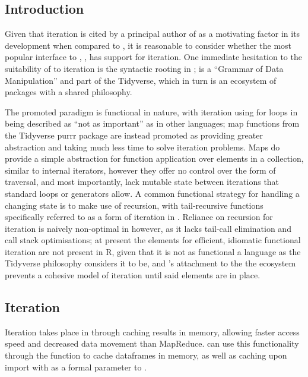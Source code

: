 \subsection{Introduction}\label{subsec:sparklyr-introduction}

Given that iteration is cited by a principal author of  as a motivating factor in its development when compared to , it is reasonable to consider whether the most popular \R{} interface to , , has support for iteration\cites{zaharia2010spark,luraschi20}.
One immediate hesitation to the suitability of  to iteration is the syntactic rooting in ;  is a ``Grammar of Data Manipulation'' and part of the Tidyverse, which in turn is an ecosystem of packages with a shared philosophy\cite{wickham2019welcome}\cite{wickham2016r}.

The promoted paradigm is functional in nature, with iteration using for loops in \R{} being described as ``not as important'' as in other languages; map functions from the Tidyverse purrr package are instead promoted as providing greater abstraction and taking much less time to solve iteration problems.
Maps do provide a simple abstraction for function application over elements in a collection, similar to internal iterators, however they offer no control over the form of traversal, and most importantly, lack mutable state between iterations that standard loops or generators allow\cite{cousineau1998functional}.
A common functional strategy for handling a changing state is to make use of recursion, with tail-recursive functions specifically referred to as a form of iteration in \cite{abelson1996sicp}.
Reliance on recursion for iteration is naively non-optimal in \R{} however, as it lacks tail-call elimination and call stack optimisations\cite{rcore2020lang}; at present the elements for efficient, idiomatic functional iteration are not present in R, given that it is not as functional a language as the Tidyverse philosophy considers it to be, and 's attachment to the the ecosystem prevents a cohesive model of iteration until said elements are in place.

\subsection{Iteration}\label{iteration}

Iteration takes place in  through caching results in memory, allowing faster access speed and decreased data movement than MapReduce\cite{zaharia2010spark}.
 can use this functionality
through the  function to
cache  dataframes in memory, as well as caching upon import with
 as a formal parameter to .

